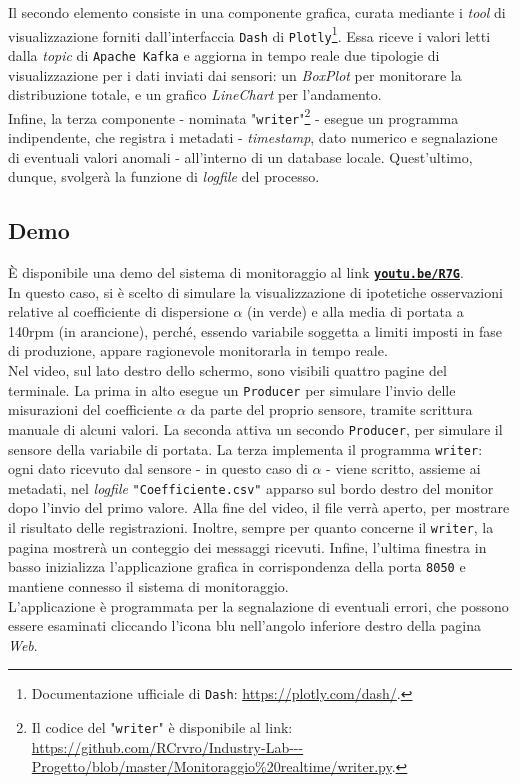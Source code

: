 \documentclass[fleqn,10pt]{SelfArx} %
\begin{document}
Il secondo elemento consiste in una componente grafica, curata mediante i \textit{tool} di visualizzazione forniti dall'interfaccia \texttt{Dash} di \texttt{Plotly}\footnote{Documentazione ufficiale di \texttt{Dash}: \url{https://plotly.com/dash/}.}. Essa riceve i valori letti dalla \textit{topic} di \texttt{Apache Kafka} e aggiorna in tempo reale due tipologie di visualizzazione per i dati inviati dai sensori: un \textit{BoxPlot} per monitorare la distribuzione totale, e un grafico \textit{LineChart} per l'andamento.\\
Infine, la terza componente - nominata "\texttt{writer}"\footnote{Il codice del "\texttt{writer}" è disponibile al link: \url{https://github.com/RCrvro/Industry-Lab---Progetto/blob/master/Monitoraggio\%20realtime/writer.py}.} - esegue un programma indipendente, che registra i metadati - \textit{timestamp}, dato numerico e segnalazione di eventuali valori anomali - all'interno di un database locale. Quest'ultimo, dunque, svolgerà la funzione di \textit{logfile} del processo. 
\subsection{Demo}
È disponibile una demo del sistema di monitoraggio al link \href{https://youtu.be/R7GCE91WyMc}{\textbf{\texttt{youtu.be/R7G}}}. 
\\
In questo caso, si è scelto di simulare la visualizzazione di ipotetiche osservazioni relative al coefficiente di dispersione $\alpha$ (in verde) e alla media di portata a 140rpm (in arancione), perché, essendo variabile soggetta a limiti imposti in fase di produzione, appare ragionevole monitorarla in tempo reale.\\
Nel video, sul lato destro dello schermo, sono visibili quattro pagine del terminale. La prima in alto esegue un \texttt{Producer} per simulare l'invio delle misurazioni del coefficiente $\alpha$ da parte del proprio sensore, tramite scrittura manuale di alcuni valori. La seconda attiva un secondo \texttt{Producer}, per simulare il sensore della variabile di portata. La terza implementa il programma \texttt{writer}: ogni dato ricevuto dal sensore - in questo caso di $\alpha$ - viene scritto, assieme ai metadati, nel \textit{logfile} \texttt{"Coefficiente.csv"} apparso sul bordo destro del monitor dopo l'invio del primo valore. Alla fine del video, il file verrà aperto, per mostrare il risultato delle registrazioni. Inoltre, sempre per quanto concerne il \texttt{writer}, la pagina mostrerà un conteggio dei messaggi ricevuti. Infine, l'ultima finestra in basso inizializza l'applicazione grafica in corrispondenza della porta \texttt{8050} e mantiene connesso il sistema di monitoraggio.\\
L'applicazione è programmata per la segnalazione di eventuali errori, che possono essere esaminati cliccando l'icona blu nell'angolo inferiore destro della pagina \textit{Web}. 
\end{document}
